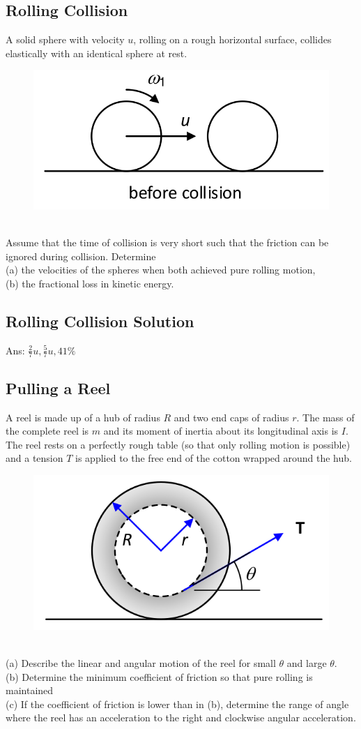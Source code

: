 \documentclass{article}
\begin{document}
\subsection{Rolling Collision }
A solid sphere with velocity $u$, rolling on a rough horizontal surface, collides elastically with an identical sphere at rest.
\begin{figure}[h]
    \centering
\includegraphics[width=0.6\linewidth]{images/rollingcollision.png}
\end{figure}\\
Assume that the time of collision is very short such that the friction can be ignored during collision. Determine\\
\noindent (a) the velocities of the spheres when both achieved pure rolling motion,\\
\noindent (b) the fractional loss in kinetic energy.

\clearpage
\subsection{Rolling Collision Solution}
Ans: $\frac{2}{7} u, \frac{5}{7} u, 41 \%$
\clearpage
\subsection{Pulling a Reel }
A reel is made up of a hub of radius $R$ and two end caps of radius $r$. The mass of the complete reel is $m$ and its moment of inertia about its longitudinal axis is $I$. The reel rests on a perfectly rough table (so that only rolling motion is possible) and a tension $T$ is applied to the free end of the cotton wrapped around the hub.\\
\begin{figure}[h]
    \centering
\includegraphics[width=0.6\linewidth]{images/pullingareel.png}
\end{figure}\\
\noindent (a) Describe the linear and angular motion of the reel for small $\theta$ and large $\theta$.\\
\noindent (b) Determine the minimum coefficient of friction so that pure rolling is maintained\\
\noindent (c) If the coefficient of friction is lower than in (b), determine the range of angle where the reel has an acceleration to the right and clockwise angular acceleration.
\clearpage
\end{document}
